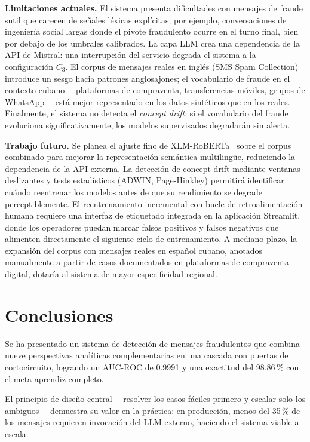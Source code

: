 \documentclass{llncs}
\begin{document}
\textbf{Limitaciones actuales.}
El sistema presenta dificultades con mensajes de fraude sutil
que carecen de señales léxicas explícitas; por ejemplo, conversaciones
de ingeniería social largas donde el pivote fraudulento ocurre en
el turno final, bien por debajo de los umbrales calibrados.
La capa LLM crea una dependencia de la API de Mistral: una interrupción
del servicio degrada el sistema a la configuración $C_3$.
El corpus de mensajes reales en inglés (SMS Spam Collection) introduce
un sesgo hacia patrones anglosajones; el vocabulario de fraude en
el contexto cubano —plataformas de compraventa, transferencias móviles,
grupos de WhatsApp— está mejor representado en los datos sintéticos
que en los reales.
Finalmente, el sistema no detecta el \emph{concept drift}:
si el vocabulario del fraude evoluciona significativamente,
los modelos supervisados degradarán sin alerta.

\textbf{Trabajo futuro.}
Se planea el ajuste fino de \mbox{XLM-RoBERTa}~\cite{conneau2020}
sobre el corpus combinado para mejorar la representación semántica
multilingüe, reduciendo la dependencia de la API externa.
La detección de concept drift mediante ventanas deslizantes y
tests estadísticos (ADWIN, Page-Hinkley) permitirá identificar
cuándo reentrenar los modelos antes de que su rendimiento se degrade
perceptiblemente.
El reentrenamiento incremental con bucle de retroalimentación humana
requiere una interfaz de etiquetado integrada en la aplicación
Streamlit, donde los operadores puedan marcar falsos positivos
y falsos negativos que alimenten directamente el siguiente ciclo
de entrenamiento.
A mediano plazo, la expansión del corpus con mensajes reales en
español cubano, anotados manualmente a partir de casos documentados
en plataformas de compraventa digital, dotaría al sistema de mayor
especificidad regional.

\section{Conclusiones}
\label{sec:conclusions}

Se ha presentado un sistema de detección de mensajes fraudulentos
que combina nueve perspectivas analíticas complementarias en una
cascada con puertas de cortocircuito, logrando un AUC-ROC de 0.9991
y una exactitud del 98.86\,\% con el meta-aprendiz completo.

El principio de diseño central —resolver los casos fáciles primero
y escalar solo los ambiguos— demuestra su valor en la práctica:
en producción, menos del 35\,\% de los mensajes requieren
invocación del LLM externo, haciendo el sistema viable a escala.
\end{document}
